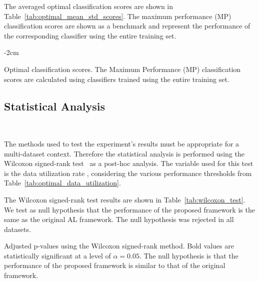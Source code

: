 \documentclass[remotesensing,article,submit,moreauthors,pdftex]{Definitions/mdpi}
\begin{document}
\begin{paracol}{2}
{}

The averaged optimal classification scores are shown in
Table~\ref{tab:optimal_mean_std_scores}. The maximum performance (MP)
classification scores are shown as a benchmark and represent the performance
of the corresponding classifier using the entire training set. 

\begin{table}[htb]
    \centering
    \addtolength{\leftskip} {-2cm}
    \addtolength{\rightskip}{-2cm}
    \caption{\label{tab:optimal_mean_std_scores}
        Optimal classification scores. The Maximum Performance (MP)
        classification scores are calculated using classifiers trained using
        the entire training set.
    }
\end{table}

\subsection{Statistical Analysis}~\label{sec:statistical-analysis}

The methods used to test the experiment's results must be appropriate for a
multi-dataset context. Therefore the statistical analysis is performed using
the Wilcoxon signed-rank test~\cite{Wilcoxon1945} as a post-hoc analysis. The
variable used for this test is the data utilization rate , considering the various performance thresholds
from Table~\ref{tab:optimal_data_utilization}.

The Wilcoxon signed-rank test results are shown in
Table~\ref{tab:wilcoxon_test}. We test as null hypothesis that the performance
of the proposed framework is the same as the original AL framework. The null
hypothesis was rejected in all datasets.

\begin{table}[htb]
	\centering
    \caption{
    	Adjusted p-values using the Wilcoxon signed-rank method. Bold values
        are statistically significant at a level of $\alpha = 0.05$. The 
        null hypothesis is that the performance of the proposed
        framework is similar to that of the original framework.
    }\label{tab:wilcoxon_test}
\end{table}


\end{paracol}
\end{document}

